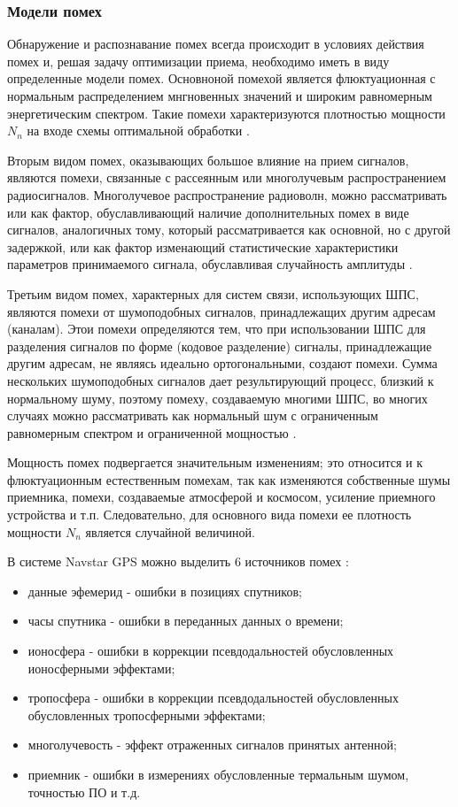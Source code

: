 \subsubsection{Модели помех}
\label{l:noise_model}
Обнаружение и распознавание помех всегда происходит в условиях действия помех и, решая задачу оптимизации приема,
необходимо иметь в виду определенные модели помех. Основноной помехой является флюктуационная с нормальным
распределением мнгновенных значений и широким равномерным энергетическим спектром. Такие помехи характеризуются
плотностью мощности ${N_n}$ на входе схемы оптимальной обработки \cite{pestryakov-book}.

Вторым видом помех, оказывающих
большое влияние на прием сигналов, являются помехи, связанные с рассеянным или многолучевым распространением
радиосигналов. Многолучевое распространение радиоволн, можно рассматривать или как фактор, обуславливающий
наличие дополнительных помех в виде сигналов, аналогичных тому, который рассматривается как основной, но с другой
задержкой, или как фактор изменающий статистические характеристики параметров принимаемого сигнала,
обуславливая случайность амплитуды \cite{pestryakov-book}.

Третьим видом помех, характерных для систем связи, использующих ШПС, являются помехи от шумоподобных сигналов,
принадлежащих другим адресам (каналам). Этои помехи определяются тем, что при использовании ШПС для разделения
сигналов по форме (кодовое разделение) сигналы, принадлежащие другим адресам, не являясь идеально ортогональными,
создают помехи. Сумма нескольких шумоподобных сигналов дает результирующий процесс, близкий к нормальному шуму,
поэтому помеху, создаваемую многими ШПС, во многих случаях можно рассматривать как нормальный шум с ограниченным
равномерным спектром и ограниченной мощностью \cite{pestryakov-book}.

Мощность помех подвергается значительным изменениям; это относится и к флюктуационным естественным помехам, так как
изменяются собственные шумы приемника, помехи, создаваемые атмосферой и космосом, усиление приемного устройства
и т.п. Следовательно, для основного вида помехи ее плотность мощности ${N_n}$ является случайной величиной.

В системе Navstar GPS можно выделить 6 источников помех \cite{parkinson_1996}:
\begin{itemize}
	\item {данные эфемерид - ошибки в позициях спутников;}
	\item {часы спутника - ошибки в переданных данных о времени;}
	\item {ионосфера - ошибки в коррекции псевдодальностей обусловленных ионосферными эффектами;}
	\item {тропосфера - ошибки в коррекции псевдодальностей обусловленных обусловленных тропосферными эффектами;}
	\item {многолучевость - эффект отраженных сигналов принятых антенной;}
	\item {приемник - ошибки в измерениях обусловленные термальным шумом, точностью ПО и т.д.}
\end{itemize}

